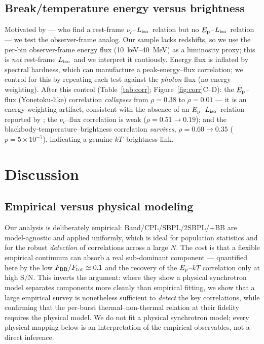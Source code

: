 \documentclass[twocolumn]{aastex631}
\newcommand{\nuc}{\ensuremath{\nu_c}}
\newcommand{\Ep}{\ensuremath{E_{\rm p}}}
\newcommand{\kT}{\ensuremath{kT}}
\newcommand{\Liso}{\ensuremath{L_{\rm iso}}}
\begin{document}
\subsection{Break/temperature energy versus brightness} \label{sec:lum}
Motivated by \citet{Mei2024} --- who find a rest-frame $\nuc$--\Liso\ relation but
no $\Ep$--\Liso\ relation --- we test the observer-frame analog. Our sample lacks
redshifts, so we use the per-bin observer-frame energy flux (10~keV--40~MeV) as a
luminosity proxy; this is \emph{not} rest-frame \Liso\ and we interpret it
cautiously. Energy flux is inflated by spectral hardness, which can manufacture a
peak-energy--flux correlation; we control for this by repeating each test against
the \emph{photon} flux (no energy weighting). After this control
(Table~\ref{tab:corr}; Figure~\ref{fig:corr}C--D): the $\Ep$--flux (Yonetoku-like)
correlation \emph{collapses} from $\rho=0.38$ to $\rho=0.01$ --- it is an
energy-weighting artifact, consistent with the absence of an $\Ep$--\Liso\
relation reported by \citeauthor{Mei2024}; the $\nuc$--flux correlation is weak
($\rho=0.51\!\to\!0.19$); and the blackbody-temperature--brightness correlation
\emph{survives}, $\rho=0.60\!\to\!0.35$ ($p=5\times10^{-7}$), indicating a genuine
$\kT$--brightness link.

\section{Discussion} \label{sec:discussion}
\subsection{Empirical versus physical modeling}
Our analysis is deliberately empirical: Band/CPL/SBPL/2SBPL/$+$BB are
model-agnostic and applied uniformly, which is ideal for population statistics and
for the robust \emph{detection} of correlations across a large $N$. The cost is
that a flexible empirical continuum can absorb a real sub-dominant component ---
quantified here by the low $F_{\rm BB}/F_{\rm tot}\simeq0.1$ and the recovery of
the $\Ep$--$\kT$ correlation only at high S/N. This inverts the
\citet{Burgess2014b} argument: where they show a physical synchrotron model
separates components more cleanly than empirical fitting, we show that a large
empirical survey is nonetheless sufficient to \emph{detect} the key correlations,
while confirming that the per-burst thermal--non-thermal relation at their fidelity
requires the physical model. We do not fit a physical synchrotron model; every
physical mapping below is an interpretation of the empirical observables, not a
direct inference.
\end{document}
